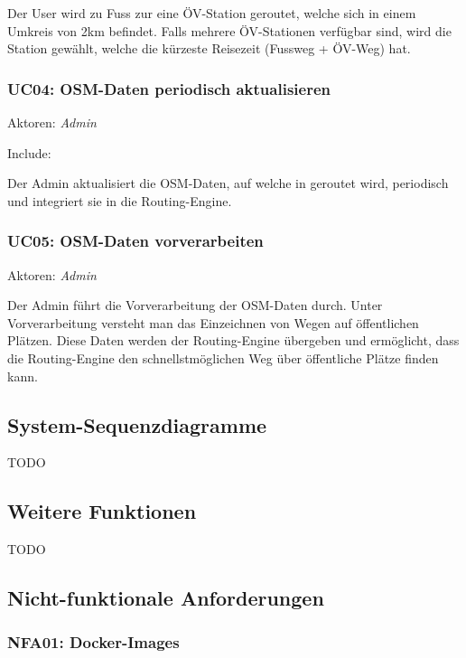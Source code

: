 Der User wird zu Fuss zur eine ÖV-Station geroutet, welche sich in einem Umkreis von 2km befindet. Falls mehrere ÖV-Stationen verfügbar sind, wird die Station gewählt, welche die kürzeste Reisezeit (Fussweg + ÖV-Weg) hat.

\subsubsection{UC04: OSM-Daten periodisch aktualisieren}
\label{usecase:UC04}
Aktoren: \emph{Admin}

Include: 

Der Admin aktualisiert die \ac{OSM}-Daten, auf welche in  geroutet wird, periodisch und integriert sie in die Routing-Engine.

\subsubsection{UC05: OSM-Daten vorverarbeiten}
\label{usecase:UC05}
Aktoren: \emph{Admin}

Der Admin führt die Vorverarbeitung der \ac{OSM}-Daten durch. Unter Vorverarbeitung versteht man das Einzeichnen von Wegen auf öffentlichen Plätzen. Diese Daten werden der Routing-Engine übergeben und ermöglicht, dass die Routing-Engine den schnellstmöglichen Weg über öffentliche Plätze finden kann.

\subsection{System-Sequenzdiagramme}
\label{sub:System-Sequenzdiagramme}

TODO

\subsection{Weitere Funktionen}
\label{sub:Weitere Funktionen}

TODO

\subsection{Nicht-funktionale Anforderungen}
\label{sub:Nicht-funktionale Anforderungen}

\subsubsection{NFA01: Docker-Images}
\label{NFA:NFA01}

